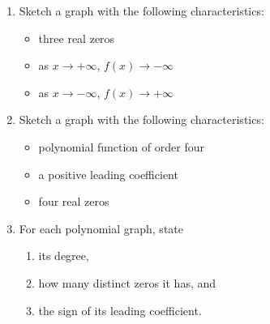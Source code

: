\documentclass[12pt, oneside]{article}
\begin{document}
\begin{enumerate}
\item Sketch a graph with the following characteristics: 
\begin{itemize}
\item three real zeros
\item as $x \rightarrow + \infty$, $f(x) \rightarrow - \infty$
\item as $x \rightarrow - \infty$, $f(x) \rightarrow + \infty$
\end{itemize}
\begin{center}
\end{center} %


\item Sketch a graph with the following characteristics: 
\begin{itemize}
\item polynomial function of order four
\item a positive leading coefficient
\item four real zeros
\end{itemize}
\begin{center}
\end{center}

\newpage

\item For each polynomial graph, state 
\begin{enumerate}
\item its degree,
\item how many distinct zeros it has, and
\item the sign of its leading coefficient.
\end{enumerate}


\end{enumerate}
\end{document}
